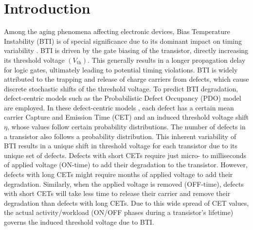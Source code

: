 \section{Introduction}
Among the aging phenomena affecting electronic devices, Bias Temperature Instability (BTI) is of special significance due to its dominant impact on timing variability \cite{duchAnalysisFunctionalErrors2020, santana-andreoImpactBTIHCI2022, moritaEfficientAnalysisMitigation2022, klemmeEfficientLearningStrategies2022}. BTI is driven by the gate biasing of the transistor, directly increasing its threshold voltage $(V_\text{th})$. This generally results in a longer propagation delay for logic gates, ultimately leading to potential timing violations. BTI is widely attributed to the trapping and release of charge carriers from defects, which cause discrete stochastic shifts of the threshold voltage. To predict BTI degradation, defect-centric models such as the Probabilistic Defect Occupancy (PDO) model \cite{martin-martinezProbabilisticDefectOccupancy2011} are employed. In these defect-centric models \cite{grasserParadigmShiftUnderstanding2011, reisingerUnderstandingModelingAC2011, kaczerDefectcentricPerspectiveDevice2015}, each defect has a certain mean carrier Capture and Emission Time (CET) and an induced threshold voltage shift $\eta$, whose values follow certain probability distributions. The number of defects in a transistor also follows a probability distribution. This inherent variability of BTI results in a unique shift in threshold voltage for each transistor due to its unique set of defects. Defects with short CETs require just micro- to milliseconds of applied voltage (ON-time) to add their degradation to the transistor. However, defects with long CETs might require months of applied voltage to add their degradation. Similarly, when the applied voltage is removed (OFF-time), defects with short CETs will take less time to release their carrier and remove their degradation than defects with long CETs. Due to this wide spread of CET values, the actual activity/workload (ON/OFF phases during a transistor's lifetime) governs the induced threshold voltage due to BTI. 

